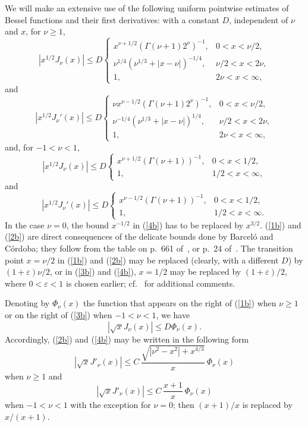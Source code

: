 \documentclass[leqno,a4paper]{amsart}
\begin{document}
We will make an extensive use of the following uniform
pointwise estimates of Bessel functions and their first derivatives: with a
constant $D$,
independent of $\nu$ and $x$, for $\nu\ge1$,
\begin{equation}
|x^{1/2}J_\nu(x)|\le D
\begin{cases}
x^{\nu+1/2}(\Gamma(\nu+1)2^\nu)^{-1},& 0<x<\nu/2,\\
\nu^{1/4}(\nu^{1/3}+|x-\nu|)^{-1/4},& \nu/2<x<2\nu,\\
1,& 2\nu<x<\infty,
\end{cases}
\label{1b}
\end{equation}
and
\begin{equation}
|x^{1/2}J_\nu'(x)|\le D
\begin{cases}
\nu x^{\nu-1/2}(\Gamma(\nu+1)2^\nu)^{-1},& 0<x<\nu/2,\\
\nu^{-1/4}(\nu^{1/3}+|x-\nu|)^{1/4},& \nu/2<x<2\nu,\\
1,& 2\nu<x<\infty,
\end{cases}
\label{2b}
\end{equation}
and, for $-1<\nu<1$,
\begin{equation}
|x^{1/2}J_\nu(x)|\le D
\begin{cases}
x^{\nu+1/2}(\Gamma(\nu+1))^{-1},& 0<x<1/2,\\
1,& 1/2<x<\infty,
\end{cases}
\label{3b}
\end{equation}
and
\begin{equation}
|x^{1/2}J_\nu'(x)|\le D
\begin{cases}
x^{\nu-1/2}(\Gamma(\nu+1))^{-1},& 0<x<1/2,\\
1,& 1/2<x<\infty.
\end{cases}
\label{4b}
\end{equation}
In the case $\nu=0$, the bound $x^{-1/2}$ in (\ref{4b}) has to be replaced
by $x^{3/2}$. (\ref{1b}) and (\ref{2b}) are direct consequences of the delicate
bounds done by Barcel\'o and C\'ordoba; they follow from the table on p.~661
of~\cite{BC}, or p.~24 of~\cite{C}. The transition point $x=\nu/2$ in (\ref{1b})
and (\ref{2b}) may be replaced (clearly, with a different $D$) by
$(1+\varepsilon)\nu/2$, or in (\ref{3b}) and (\ref{4b}), $x=1/2$ may be replaced by $(1+\varepsilon)/2$,
where $0<\varepsilon<1$ is chosen
earlier; cf.~\cite{St} for additional comments.

Denoting by $\Phi_\nu(x)$ the function that appears on the right of (\ref{1b})
when $\nu\ge1$ or on the right of (\ref{3b}) when $-1<\nu<1$, we have
\begin{equation}
\label{ec:Jalpha}
|\sqrt{x}J_\nu(x)|\le D \Phi_\nu(x).
\end{equation}
Accordingly, (\ref{2b}) and (\ref{4b}) may be written in the following form
\begin{equation}
\label{ec:cotaJ'}
|\sqrt{x}J'_\nu(x)| \le C \,\frac{\sqrt{|\nu^2-x^2|+x^{4/3}}}{x}\,\Phi_\nu(x)
\end{equation}
when $\nu\ge1$ and
\begin{equation}
\label{ec:cotaJ''}
|\sqrt{x}J'_\nu(x)|\le C \, \frac{x+1}x \,\Phi_\nu(x)
\end{equation}
when $-1<\nu<1$ with the exception for $\nu=0$; then $(x+1)/x$ is
replaced by $x/(x+1)$.
\end{document}
